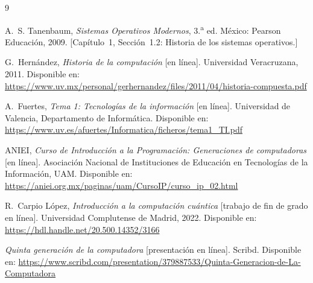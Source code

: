 \documentclass[10pt,letterpaper,twocolumn]{article}
\begin{document}
\renewcommand{\refname}{Referencias}

\begin{thebibliography}{9}
\small

A.~S. Tanenbaum,
\emph{Sistemas Operativos Modernos}, 3.\textsuperscript{a} ed.
México: Pearson Educación, 2009. [Capítulo~1, Sección~1.2: Historia de
los sistemas operativos.]

G.~Hernández,
\emph{Historia de la computación} [en línea].
Universidad Veracruzana, 2011. Disponible en:
\url{https://www.uv.mx/personal/gerhernandez/files/2011/04/historia-compuesta.pdf}

A.~Fuertes,
\emph{Tema 1: Tecnologías de la información} [en línea].
Universidad de Valencia, Departamento de Informática. Disponible en:
\url{https://www.uv.es/afuertes/Informatica/ficheros/tema1_TI.pdf}

ANIEI,
\emph{Curso de Introducción a la Programación: Generaciones de
computadoras} [en línea]. Asociación Nacional de Instituciones de
Educación en Tecnologías de la Información, UAM. Disponible en:
\url{https://aniei.org.mx/paginas/uam/CursoIP/curso_ip_02.html}

R.~Carpio López,
\emph{Introducción a la computación cuántica} [trabajo de fin de grado
en línea]. Universidad Complutense de Madrid, 2022. Disponible en:
\url{https://hdl.handle.net/20.500.14352/3166}

\emph{Quinta generación de la computadora} [presentación en línea].
Scribd. Disponible en:
\url{https://www.scribd.com/presentation/379887533/Quinta-Generacion-de-La-Computadora}

\end{thebibliography}
\end{document}
